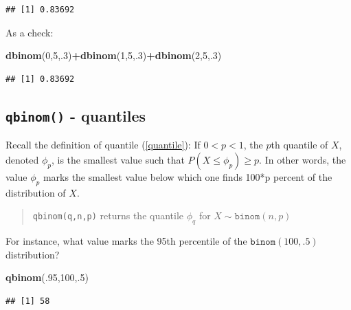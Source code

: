\documentclass[
]{book}
\newenvironment{Shaded}{\begin{snugshade}}{\end{snugshade}}
\newcommand{\DecValTok}[1]{\textcolor[rgb]{0.00,0.00,0.81}{#1}}
\newcommand{\FunctionTok}[1]{\textcolor[rgb]{0.13,0.29,0.53}{\textbf{#1}}}
\newcommand{\NormalTok}[1]{#1}
\newcommand{\SpecialCharTok}[1]{\textcolor[rgb]{0.81,0.36,0.00}{\textbf{#1}}}
\theoremstyle{definition}
\theoremstyle{definition}
\theoremstyle{definition}
\theoremstyle{definition}
\theoremstyle{remark}
\begin{document}
\begin{verbatim}
## [1] 0.83692
\end{verbatim}

As a check:

\begin{Shaded}
\begin{Highlighting}[]
\FunctionTok{dbinom}\NormalTok{(}\DecValTok{0}\NormalTok{,}\DecValTok{5}\NormalTok{,.}\DecValTok{3}\NormalTok{)}\SpecialCharTok{+}\FunctionTok{dbinom}\NormalTok{(}\DecValTok{1}\NormalTok{,}\DecValTok{5}\NormalTok{,.}\DecValTok{3}\NormalTok{)}\SpecialCharTok{+}\FunctionTok{dbinom}\NormalTok{(}\DecValTok{2}\NormalTok{,}\DecValTok{5}\NormalTok{,.}\DecValTok{3}\NormalTok{)}
\end{Highlighting}
\end{Shaded}

\begin{verbatim}
## [1] 0.83692
\end{verbatim}

\subsection*{\texorpdfstring{\texttt{qbinom()} - quantiles}{qbinom() - quantiles}}\label{qbinom---quantiles}

Recall the definition of quantile (\ref{quantile}): If \(0 < p < 1\), the \(p\)th quantile of \(X\), denoted \(\phi_p\), is the smallest value such that \(P(X \leq \phi_p) \geq p\). In other words, the value \(\phi_p\) marks the smallest value below which one finds 100*p percent of the distribution of \(X\).

\begin{quote}
\texttt{qbinom(q,n,p)} returns the quantile \(\phi_q\) for \(X \sim \texttt{binom}(n,p)\)
\end{quote}

For instance, what value marks the 95th percentile of the \(\texttt{binom}(100,.5)\) distribution?

\begin{Shaded}
\begin{Highlighting}[]
\FunctionTok{qbinom}\NormalTok{(.}\DecValTok{95}\NormalTok{,}\DecValTok{100}\NormalTok{,.}\DecValTok{5}\NormalTok{)}
\end{Highlighting}
\end{Shaded}

\begin{verbatim}
## [1] 58
\end{verbatim}
\end{document}
